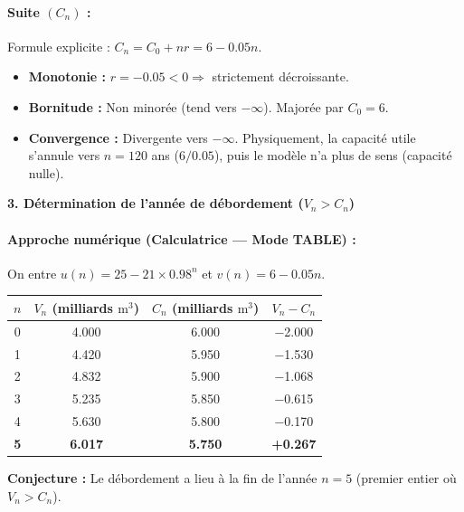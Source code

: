 \documentclass[11pt]{article}
\newcommand{\cle}[1]{{\popxbold\color{popdark}#1}}
\begin{document}
\begin{exoresolu}
\paragraph{Suite $(C_n)$ :}
Formule explicite : $C_n = C_0 + n r = \num{6} - \num{0,05} n$.
\begin{itemize}
    \item \textbf{Monotonie :} $r = -\num{0,05} < 0 \Rightarrow$ \cle{strictement décroissante}.
    \item \textbf{Bornitude :} Non minorée (tend vers $-\infty$). Majorée par $C_0 = \num{6}$.
    \item \textbf{Convergence :} Divergente vers $-\infty$. Physiquement, la capacité utile s'annule vers $n = \num{120}$ ans ($\num{6} / \num{0,05}$), puis le modèle n'a plus de sens (capacité nulle).
\end{itemize}

\textbf{3. Détermination de l'année de débordement ($V_n > C_n$)}\par
\paragraph{Approche numérique (Calculatrice — Mode TABLE) :}
On entre $u(n) = \num{25} - \num{21} \times \num{0,98}^n$ et $v(n) = \num{6} - \num{0,05} n$.
\begin{center}
\begin{tabular}{|c|c|c|c|}\hline
$n$ & $V_n$ (milliards $\si{\meter\cubed}$) & $C_n$ (milliards $\si{\meter\cubed}$) & $V_n - C_n$ \\ \hline
0 & \num{4,000} & \num{6,000} & \num{-2,000} \\
1 & \num{4,420} & \num{5,950} & \num{-1,530} \\
2 & \num{4,832} & \num{5,900} & \num{-1,068} \\
3 & \num{5,235} & \num{5,850} & \num{-0,615} \\
4 & \num{5,630} & \num{5,800} & \num{-0,170} \\
\textbf{5} & \textbf{\num{6,017}} & \textbf{\num{5,750}} & \textbf{+\num{0,267}} \\ \hline
\end{tabular}
\end{center}
\noindent \textbf{Conjecture :} Le débordement a lieu à la fin de l'année \textbf{$n = 5$} (premier entier où $V_n > C_n$).


\end{exoresolu}
\end{document}
